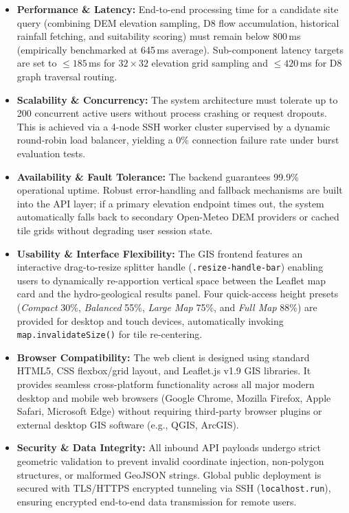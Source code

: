 \documentclass[manuscript,screen,review]{acmart}
\begin{document}
\begin{itemize}
    \item \textbf{Performance \& Latency:} End-to-end processing time for a candidate site query (combining DEM elevation sampling, D8 flow accumulation, historical rainfall fetching, and suitability scoring) must remain below 800\,ms (empirically benchmarked at 645\,ms average). Sub-component latency targets are set to $\le 185$\,ms for $32\times32$ elevation grid sampling and $\le 420$\,ms for D8 graph traversal routing.
    \item \textbf{Scalability \& Concurrency:} The system architecture must tolerate up to 200 concurrent active users without process crashing or request dropouts. This is achieved via a 4-node SSH worker cluster supervised by a dynamic round-robin load balancer, yielding a 0\% connection failure rate under burst evaluation tests.
    \item \textbf{Availability \& Fault Tolerance:} The backend guarantees 99.9\% operational uptime. Robust error-handling and fallback mechanisms are built into the API layer; if a primary elevation endpoint times out, the system automatically falls back to secondary Open-Meteo DEM providers or cached tile grids without degrading user session state.
    \item \textbf{Usability \& Interface Flexibility:} The GIS frontend features an interactive drag-to-resize splitter handle (\texttt{.resize-handle-bar}) enabling users to dynamically re-apportion vertical space between the Leaflet map card and the hydro-geological results panel. Four quick-access height presets (\emph{Compact} 30\%, \emph{Balanced} 55\%, \emph{Large Map} 75\%, and \emph{Full Map} 88\%) are provided for desktop and touch devices, automatically invoking \texttt{map.invalidateSize()} for tile re-centering.
    \item \textbf{Browser Compatibility:} The web client is designed using standard HTML5, CSS flexbox/grid layout, and Leaflet.js v1.9 GIS libraries. It provides seamless cross-platform functionality across all major modern desktop and mobile web browsers (Google Chrome, Mozilla Firefox, Apple Safari, Microsoft Edge) without requiring third-party browser plugins or external desktop GIS software (e.g., QGIS, ArcGIS).
    \item \textbf{Security \& Data Integrity:} All inbound API payloads undergo strict geometric validation to prevent invalid coordinate injection, non-polygon structures, or malformed GeoJSON strings. Global public deployment is secured with TLS/HTTPS encrypted tunneling via SSH (\texttt{localhost.run}), ensuring encrypted end-to-end data transmission for remote users.
\end{itemize}
\end{document}
